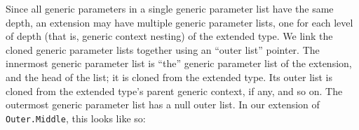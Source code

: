 \documentclass[../generics]{subfiles}
\begin{document}
Since all generic parameters in a single generic parameter list have the same depth, an extension may have multiple generic parameter lists, one for each level of depth (that is, generic context nesting) of the extended type. We link the cloned generic parameter lists together using an ``outer list'' pointer. The innermost generic parameter list is ``the'' generic parameter list of the extension, and the head of the list; it is cloned from the extended type. Its outer list is cloned from the extended type's parent generic context, if any, and so on. The outermost generic parameter list has a null outer list. In our extension of \texttt{Outer.Middle}, this looks like so:
\begin{quote}
\end{quote}
\end{document}

